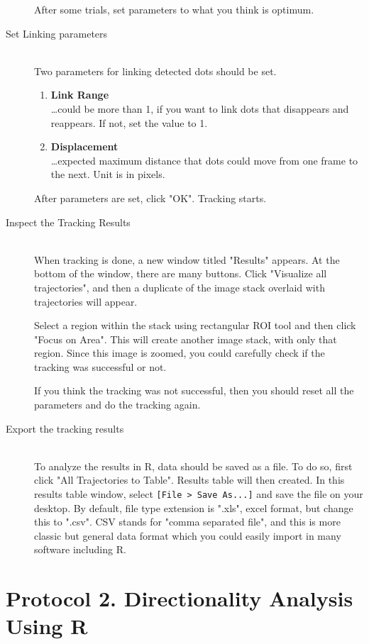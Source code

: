 \documentclass[11pnt]{article}
\begin{document}
\begin{description}
After some trials, set parameters to what you think is optimum. 

\item[Set Linking parameters]\hfill\\

Two parameters for linking detected dots should be set. 
\begin{enumerate}
\item \textbf{Link Range}\hfill\\
\dots could be more than 1, if you want to link dots that disappears and reappears. If not, set the value to 1.
\item \textbf{Displacement}\hfill\\
\dots expected maximum distance that dots could move from one frame to the next. Unit is in pixels. 
\end{enumerate}
After parameters are set, click "OK". Tracking starts. 

\item[Inspect the Tracking Results]\hfill\\

When tracking is done, a new window titled "Results" appears. At the bottom of the window, there are many buttons. Click "Visualize all trajectories", and then a duplicate of the image stack overlaid with trajectories will appear. 

Select a region within the stack using rectangular ROI tool and then click "Focus on Area". This will create another image stack, with only that region. Since this image is zoomed, you could carefully check if the tracking was successful or not. 

If you think the tracking was not successful, then you should reset all the parameters and do the tracking again.
\item[Export the tracking results]\hfill\\

To analyze the results in R, data should be saved as a file. To do so, first click "All Trajectories to Table". Results table will then created. In this results table window, select \verb"[File > Save As...]" and save the file on your desktop. By default, file type extension is ".xls", excel format, but change this to ".csv". CSV stands for "comma separated file", and this is more classic but general data format which you could easily import in many software including R.  
\end{description}

\section{Protocol 2. Directionality Analysis Using R}
\end{document}
